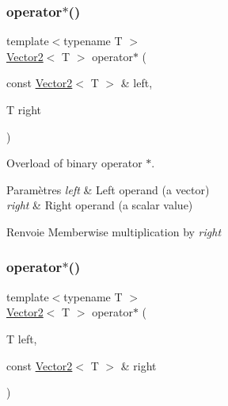 \subsubsection{\texorpdfstring{operator$\ast$()}{operator*()}\hspace{0.1cm}{\footnotesize\ttfamily [1/2]}}
{\footnotesize\ttfamily template$<$typename T $>$ \\
\hyperlink{classsf_1_1Vector2}{Vector2}$<$ T $>$ operator$\ast$ (\begin{DoxyParamCaption}\item[{const \hyperlink{classsf_1_1Vector2}{Vector2}$<$ T $>$ \&}]{left,  }\item[{T}]{right }\end{DoxyParamCaption})\hspace{0.3cm}{\ttfamily [related]}}



Overload of binary operator $\ast$. 


\begin{DoxyParams}{Paramètres}
{\em left} & Left operand (a vector) \\
\hline
{\em right} & Right operand (a scalar value)\\
\hline
\end{DoxyParams}
\begin{DoxyReturn}{Renvoie}
Memberwise multiplication by {\itshape right} 
\end{DoxyReturn}
\mbox{\label{classsf_1_1Vector2_ad8b3e1cf7b156a984bc1427539ca8605}} 
\subsubsection{\texorpdfstring{operator$\ast$()}{operator*()}\hspace{0.1cm}{\footnotesize\ttfamily [2/2]}}
{\footnotesize\ttfamily template$<$typename T $>$ \\
\hyperlink{classsf_1_1Vector2}{Vector2}$<$ T $>$ operator$\ast$ (\begin{DoxyParamCaption}\item[{T}]{left,  }\item[{const \hyperlink{classsf_1_1Vector2}{Vector2}$<$ T $>$ \&}]{right }\end{DoxyParamCaption})\hspace{0.3cm}{\ttfamily [related]}}



